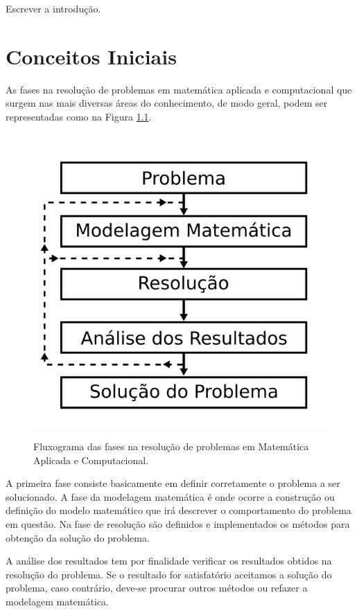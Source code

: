 \documentclass[
	12pt,				%
	openright,			%
	twoside,			%
	a4paper,			%
	english,			%
	french,				%
	brazil,				%
	sumario=tradicional
]{abntex2}
\numberwithin{example}{chapter}
\numberwithin{remark}{chapter}
\numberwithin{definition}{chapter}
\numberwithin{figure}{chapter}
\newcommand{\todo}[1]{
	{\color{red}#1}
}
\begin{document}
\todo{Escrever a introdução.}

\chapter{Conceitos Iniciais}

As fases na resolução de problemas em matemática aplicada e computacional que surgem nas mais diversas áreas do conhecimento, de modo geral, podem ser representadas como na Figura \ref{fig:fases_resolucao_problemas}.

\begin{figure}[h]
	\centering
	\caption{Fluxograma das fases na resolução de problemas em Matemática Aplicada e Computacional.}
	\includegraphics[scale=0.2]{figuras/figura_001}
	\label{fig:fases_resolucao_problemas}
\end{figure}

A primeira fase consiste basicamente em definir corretamente o problema a ser solucionado. A fase da modelagem matemática é onde ocorre a construção ou definição do modelo matemático que irá descrever o comportamento do problema em questão. Na fase de resolução são definidos e implementados os métodos para obtenção da solução do problema.

A análise dos resultados tem por finalidade verificar os resultados obtidos na resolução do problema. Se o resultado for satisfatório aceitamos a solução do problema, caso contrário, deve-se procurar outros métodos ou refazer a modelagem matemática.
\end{document}

